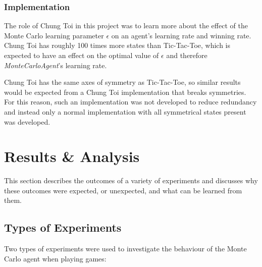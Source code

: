 \documentclass[11pt,a4paper]{report}
\begin{document}
\subsection{Implementation}

The role of Chung Toi in this project was to learn more about the effect of the Monte Carlo learning parameter $\epsilon$ on an agent's learning rate and winning rate. Chung Toi has roughly 100 times more states than Tic-Tac-Toe, which is expected to have an effect on the optimal value of $\epsilon$ and therefore \emph{MonteCarloAgent}'s learning rate.

Chung Toi has the same axes of symmetry as Tic-Tac-Toe, so similar results would be expected from a Chung Toi implementation that breaks symmetries. For this reason, such an implementation was not developed to reduce redundancy and instead only a normal implementation with all symmetrical states present was developed.


\chapter{Results \& Analysis}

This section describes the outcomes of a variety of experiments and discusses why these outcomes were expected, or unexpected, and what can be learned from them.


\section{Types of Experiments}

Two types of experiments were used to investigate the behaviour of the Monte Carlo agent when playing games:
\end{document}
